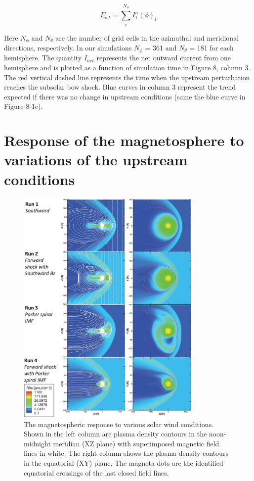 \begin{equation}
    I_{net}^n = \sum_i^{N_\phi} I_1^n(\phi)_i
\end{equation}

Here $N_\phi$ and $N_\theta$ are the number of grid cells in the azimuthal and meridional directions, respectively. In our simulations $N_\phi$ = 361 and $N_\theta$ = 181 for each hemisphere. The quantity $I_{net}$ represents the net outward current from one hemisphere and is plotted as a function of simulation time in Figure 8, column 3. The red vertical dashed line represents the time when the upstream perturbation reaches the subsolar bow shock. Blue curves in column 3 represent the trend expected if there was no change in upstream conditions (same the blue curve in Figure 8‐1c).

\section{Response of the magnetosphere to variations of the upstream conditions}

\begin{figure}
    \centering
    \includegraphics[width=0.8\textwidth]{images3/mhd-solarwind-upstream.jpg}
    \caption{The magnetospheric response to various solar wind conditions. Shown in the left column are plasma density contours in the noon-midnight meridian (XZ plane) with superimposed magnetic field lines in white. The right column shows the plasma density contours in the equatorial (XY) plane. The magneta dots are the identified equatorial crossings of the last closed field lines.}
    \label{fig:mhd-solarwind-upstream}
\end{figure}

